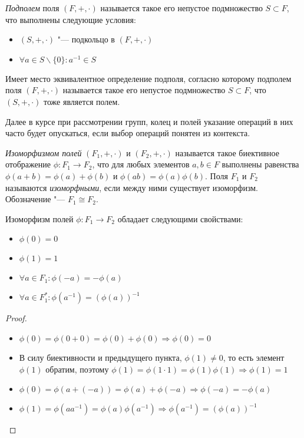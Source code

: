\begin{definition}
	\textit{Подполем} поля $(F, +, \cdot)$ называется такое его непустое подмножество $S \subset F$, что выполнены следующие условия:
	\begin{itemize}
		\item $(S, +, \cdot)$ "--- подкольцо в $(F, +, \cdot)$
		\item $\forall a \in S\backslash\{0\}: a^{-1} \in S$
	\end{itemize}
\end{definition}

\begin{note}
	Имеет место эквивалентное определение подполя, согласно которому подполем поля $(F, +, \cdot)$ называется такое его непустое подмножество $S \subset F$, что $(S, +, \cdot)$ тоже является полем.
\end{note}

\begin{note}
	Далее в курсе при рассмотрении групп, колец и полей указание операций в них часто будет опускаться, если выбор операций понятен из контекста.
\end{note}

\begin{definition}
	\textit{Изоморфизмом полей} $(F_1, +, \cdot)$ и $(F_2, +, \cdot)$ называется такое биективное отображение $\phi : F_1 \rightarrow F_2$, что для любых элементов $a, b \in F$ выполнены равенства $\phi(a + b) = \phi(a) + \phi(b)$ и $\phi(ab) = \phi(a)\phi(b)$. Поля $F_1$ и $F_2$ называются \textit{изоморфными}, если между ними существует изоморфизм. Обозначение "--- $F_1 \cong F_2$.
\end{definition}

\begin{proposition}
	Изоморфизм полей $\phi: F_1 \to F_2$ обладает следующими свойствами:
	\begin{itemize}
		\item $\phi(0) = 0$
		\item $\phi(1) = 1$
		\item $\forall a \in F_1: \phi(-a) = -\phi(a)$
		\item $\forall a \in F_1^*: \phi(a^{-1}) = (\phi(a))^{-1}$
	\end{itemize}
\end{proposition}

\begin{proof}~
	\begin{itemize}
		\item $\phi(0) = \phi(0 + 0) = \phi(0) + \phi(0) \Rightarrow \phi(0) = 0$
		\item В силу биективности и предыдущего пункта, $\phi(1) \ne 0$, то есть элемент $\phi(1)$ обратим, поэтому $\phi(1) = \phi(1\cdot1) = \phi(1)\phi(1) \Rightarrow \phi(1) = 1$
		\item $\phi(0) = \phi(a + (-a)) = \phi(a) + \phi(-a) \Rightarrow \phi(-a) = -\phi(a)$
		\item $\phi(1) = \phi(aa^{-1}) = \phi(a)\phi(a^{-1}) \Rightarrow \phi(a^{-1}) = (\phi(a))^{-1}$\qedhere
	\end{itemize}
\end{proof}

